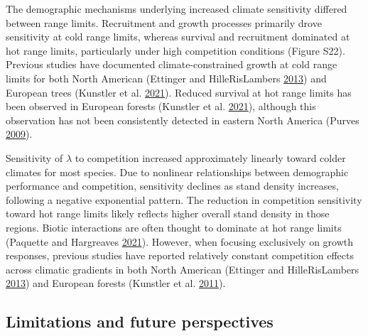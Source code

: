 \documentclass[12pt]{article}
\begin{document}
The demographic mechanisms underlying increased climate sensitivity
differed between range limits. Recruitment and growth processes
primarily drove sensitivity at cold range limits, whereas survival and
recruitment dominated at hot range limits, particularly under high
competition conditions (Figure S22). Previous studies have documented
climate-constrained growth at cold range limits for both North American
(Ettinger and HilleRisLambers
\protect\hyperlink{ref-Ettinger2013}{2013}) and European trees (Kunstler
et al. \protect\hyperlink{ref-Kunstler2021}{2021}). Reduced survival at
hot range limits has been observed in European forests (Kunstler et al.
\protect\hyperlink{ref-Kunstler2021}{2021}), although this observation
has not been consistently detected in eastern North America (Purves
\protect\hyperlink{ref-Purves2009}{2009}).

Sensitivity of \(\lambda\) to competition increased approximately
linearly toward colder climates for most species. Due to nonlinear
relationships between demographic performance and competition,
sensitivity declines as stand density increases, following a negative
exponential pattern. The reduction in competition sensitivity toward hot
range limits likely reflects higher overall stand density in those
regions. Biotic interactions are often thought to dominate at hot range
limits (Paquette and Hargreaves
\protect\hyperlink{ref-Paquette2021}{2021}). However, when focusing
exclusively on growth responses, previous studies have reported
relatively constant competition effects across climatic gradients in
both North American (Ettinger and HilleRisLambers
\protect\hyperlink{ref-Ettinger2013}{2013}) and European forests
(Kunstler et al. \protect\hyperlink{ref-Kunstler2011a}{2011}).

\hypertarget{limitations-and-future-perspectives}{%
\subsection{Limitations and future
perspectives}\label{limitations-and-future-perspectives}}
\end{document}
